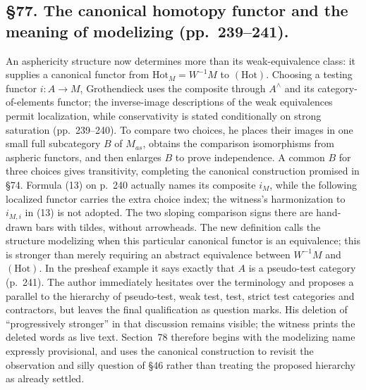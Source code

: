 \documentclass[10pt,oneside]{book}
\begin{document}
\subsection*{\S77. The canonical homotopy functor and the meaning of modelizing (pp.\ 239--241).}
An asphericity structure now determines more than its weak-equivalence class: it supplies a canonical functor from $\mathrm{Hot}_M=W^{-1}M$ to $(\mathrm{Hot})$. Choosing a testing functor $i:A\to M$, Grothendieck uses the composite through $A^\wedge$ and its category-of-elements functor; the inverse-image descriptions of the weak equivalences permit localization, while conservativity is stated conditionally on strong saturation (pp.\ 239--240). To compare two choices, he places their images in one small full subcategory $B$ of $M_{as}$, obtains the comparison isomorphisms from aspheric functors, and then enlarges $B$ to prove independence. A common $B$ for three choices gives transitivity, completing the canonical construction promised in \S74. Formula (13) on p.\ 240 actually names its composite $i_M$, while the following localized functor carries the extra choice index; the witness's harmonization to $i_{M,i}$ in (13) is not adopted. The two sloping comparison signs there are hand-drawn bars with tildes, without arrowheads. The new definition calls the structure modelizing when this particular canonical functor is an equivalence; this is stronger than merely requiring an abstract equivalence between $W^{-1}M$ and $(\mathrm{Hot})$. In the presheaf example it says exactly that $A$ is a pseudo-test category (p.\ 241). The author immediately hesitates over the terminology and proposes a parallel to the hierarchy of pseudo-test, weak test, test, strict test categories and contractors, but leaves the final qualification as question marks. His deletion of “progressively stronger” in that discussion remains visible; the witness prints the deleted words as live text. Section~78 therefore begins with the modelizing name expressly provisional, and uses the canonical construction to revisit the observation and silly question of \S46 rather than treating the proposed hierarchy as already settled.
\end{document}
